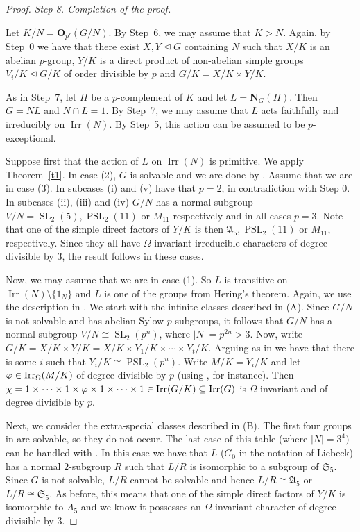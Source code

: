 \documentclass[12pt]{amsart}
\theoremstyle{theorem}
\theoremstyle{definition}
\newcommand{\fA} {\mathfrak A}
\newcommand{\fS} {\mathfrak S}
\newcommand{\bO}{{\mathbf O}}
\newcommand{\bN} {\mathbf N}
\newcommand{\Irr}{{\operatorname{Irr}}}
\newcommand{\SL}{\operatorname{SL}}
\newcommand{\PSL}{\operatorname{PSL}}
\begin{document}
\begin{proof}
		\textit{Step 8. Completion of the proof.}
		\medskip
		
		
		Let $K/N=\bO_{p'}(G/N)$. By Step~6, we may assume that $K>N$. Again, by Step~0 we have that there exist $X,Y\trianglelefteq G$
		containing $N$ such that $X/K$ is an abelian $p$-group, $Y/K$ is a direct
		product of non-abelian simple groups $V_i/K\trianglelefteq G/K$ of order
		divisible by $p$ and $G/K=X/K\times Y/K$.
		
		As in Step~7, let $H$ be a $p$-complement of $K$ and let $L=\bN_G(H)$. Then
		$G=NL$ and $N\cap L=1$. By Step~7, we may assume that $L$ acts faithfully and
		irreducibly on $\Irr(N)$. By Step~5, this action can be assumed to be $p$-exceptional.
		\medskip
		
		Suppose first that the action of $L$ on $\Irr(N)$ is primitive. We apply
		Theorem~\ref{t1}. In case (2), $G$ is solvable and we are done by \cite[Theorem 3]{MMRSF}.
		Assume that we are in case (3). In subcases (i) and (v) have that $p=2$, in contradiction with Step 0. In subcases (ii), (iii) and (iv) $G/N$ has a normal subgroup
		$V/N=\SL_2(5), \PSL_2(11)$ or $M_{11}$ respectively and in all cases $p=3$.
		Note that one of the simple direct factors of $Y/K$ is then $\fA_5,\PSL_2(11)$
		or $M_{11}$, respectively. Since they all have $\Omega$-invariant irreducible characters of degree divisible by $3$, the result follows in these cases.
		\medskip 
		
		Now, we may assume that we are in case (1). So $L$ is transitive on
		$\Irr(N)\setminus\{1_N\}$ and $L$ is one of the groups from Hering's theorem.
		Again, we use the description in \cite[Appendix~1]{liebeck}. 
		We start with the infinite classes described in (A). Since $G/N$ is not
		solvable and has abelian Sylow $p$-subgroups, it follows that $G/N$ has a
		normal subgroup $V/N\cong \SL_2(p^n)$, where $|N|=p^{2n}>3$. Now, write $G/K=X/K\times Y/K=X/K\times Y_1/K\times\cdots\times Y_t/K$. Arguing as in \cite{MinimalHeights} we have that there is some $i$ such that $Y_i/K\cong \PSL_2(p^n)$. Write $M/K=Y_i/K$ and let $\varphi\in{\rm Irr}_\Omega(M/K)$ of degree divisible by $p$ (using \cite[Theorem 2.8]{MMRSF}, for instance). Then $\chi=1\times \cdots\times 1\times \varphi\times 1\times\cdots\times 1\in{\rm Irr}(G/K)\subseteq{\rm Irr}(G)$ is $\Omega$-invariant and of degree divisible by $p$.
		\medskip
		
		Next, we consider the extra-special classes described in (B). The first four
		groups in \cite[Table~10]{liebeck} are solvable, so they do not occur. The last case
		of this table (where $|N|=3^4)$ can be handled with \cite{gap}. In this case we have that $L$ ($G_0$ in the notation of Liebeck) has a normal $2$-subgroup $R$ such that $L/R$ is isomorphic to a subgroup of $\fS_5$. Since $G$ is not solvable, $L/R$ cannot be solvable and hence $L/R\cong\fA_5$ or $L/R\cong \fS_5$. As before, this means that one of the simple direct factors of $Y/K$ is isomorphic to $A_5$ and we know it possesses an $\Omega$-invariant character of degree divisible by $3$.
		\medskip
		

\end{proof}
\end{document}

